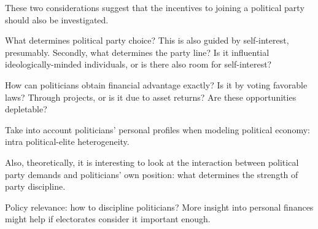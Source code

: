 These two considerations suggest that the incentives to joining a political party should also be investigated.









What determines political party choice? This is also guided by self-interest, presumably. Secondly, what determines the party line? Is it influential ideologically-minded individuals, or is there also room for self-interest?


How can politicians obtain financial advantage exactly? Is it by voting favorable laws? Through projects, or is it due to asset returns? Are these opportunities depletable?


Take into account politicians' personal profiles when modeling political economy: intra political-elite heterogeneity.





Also, theoretically, it is interesting to look at the interaction between political party demands and politicians' own position: what determines the strength of party discipline.




Policy relevance: how to discipline politicians? More insight into personal finances might help if electorates consider it important enough. 


